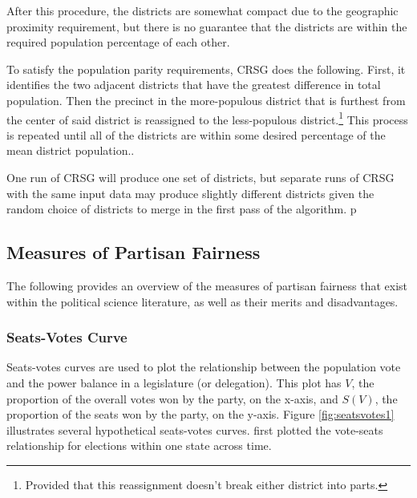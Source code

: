 After this procedure, the districts are somewhat compact due to the geographic proximity requirement, but there is no guarantee that the districts are within the required population percentage of each other. 

To satisfy the population parity requirements, CRSG does the following. First, it identifies the two adjacent districts that have the greatest difference in total population. Then the precinct in the more-populous district that is furthest from the center of said district is reassigned to the less-populous district.\footnote{Provided that this reassignment doesn't break either district into parts.} This process is repeated until all of the districts are within some desired percentage of the mean district population.\textcite[249-50]{chen2013}.

One run of CRSG will produce one set of districts, but separate runs of CRSG with the same input data may produce slightly different districts given the random choice of districts to merge in the first pass of the algorithm. 
p
\subsection{Measures of Partisan Fairness}

The following provides an overview of the measures of partisan fairness that exist within the political science literature, as well as their merits and disadvantages. 

\subsubsection{Seats-Votes Curve}

Seats-votes curves are used to plot the relationship between the population vote and the power balance in a legislature (or delegation). This plot has $V$, the proportion of the overall votes won by the party, on the x-axis, and $S(V)$, the proportion of the seats won by the party, on the y-axis. Figure \ref{fig:seatsvotes1} illustrates several hypothetical seats-votes curves. \textcite{tufte1973} first plotted the vote-seats relationship for elections within one state across time. 

